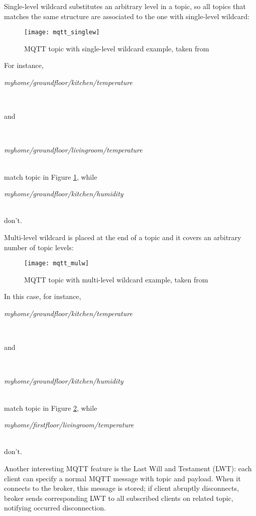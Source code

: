 Single-level wildcard substitutes an arbitrary level in a topic, so all topics that matches the same structure are associated to the one with single-level wildcard:

\begin{figure}[H]

    \centering
    \texttt{[image: mqtt\_singlew]}
    \caption{MQTT topic with single-level wildcard example, taken from \cite{site:hivemq}}
    \label{fig:mqtt_singlew}

\end{figure}

For instance,\\
\centerline{\textit{myhome\slash{}groundfloor\slash{}kitchen\slash{}temperature}}\\
\centerline{and}\\
\centerline{\textit{myhome\slash{}groundfloor\slash{}livingroom\slash{}temperature}}\\
match topic in Figure \ref{fig:mqtt_singlew}, while\\
\centerline{\textit{myhome\slash{}groundfloor\slash{}kitchen\slash{}humidity}}\\
don't.

Multi-level wildcard is placed at the end of a topic and it covers an arbitrary number of topic levels:

\begin{figure}[H]

    \centering
    \texttt{[image: mqtt\_mulw]}
    \caption{MQTT topic with multi-level wildcard example, taken from \cite{site:hivemq}}
    \label{fig:mqtt_mulw}

\end{figure}

In this case, for instance,\\
\centerline{\textit{myhome\slash{}groundfloor\slash{}kitchen\slash{}tem\-per\-a\-ture}}\\
\centerline{and}\\
\centerline{\textit{myhome\slash{}groundfloor\slash{}kitchen\slash{}humidity}}\\
match topic in Figure \ref{fig:mqtt_mulw}, while\\
\centerline{\textit{myhome\slash{}firstfloor\slash{}livingroom\slash{}temperature}}\\
don't.

Another interesting MQTT feature is the Last Will and Testament (LWT): each client can specify a normal MQTT message with topic and payload. When it connects to the broker, this message is stored; if client abruptly disconnects, broker sends corresponding LWT to all subscribed clients on related topic, notifying occurred disconnection.





